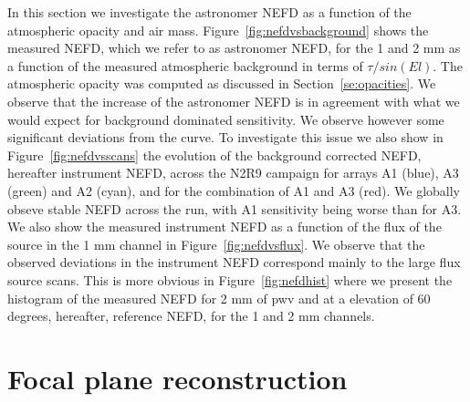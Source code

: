 \documentclass[a4paper, 11pt]{article} %
\begin{document}
In this section we investigate the astronomer NEFD as a function of the atmospheric opacity and air mass. Figure~\ref{fig:nefdvsbackground} shows the measured NEFD, which we refer to as astronomer NEFD, for the 1 and 2 mm as a function of the measured atmospheric background in terms of $\tau/sin(El)$. The atmospheric opacity was computed as discussed in Section~\ref{se:opacities}. We observe that the increase of the astronomer NEFD is in agreement with what we would expect for background dominated sensitivity. We observe however some significant deviations from the curve. To investigate this issue we also show in Figure~\ref{fig:nefdvsscans} the evolution of the background corrected NEFD, hereafter instrument NEFD, across the N2R9 campaign for arrays A1 (blue), A3 (green) and A2 (cyan), and for the combination of A1 and A3 (red). We globally obseve stable NEFD across the run, with A1 sensitivity being worse than for A3. We also show the measured instrument NEFD as a function of the flux of the source in the 1 mm channel in Figure~\ref{fig:nefdvsflux}. We observe that the observed deviations in the instrument NEFD correspond mainly to the large flux source scans. This is more obvious in Figure~\ref{fig:nefdhist} where we present the histogram of the measured NEFD for 2 mm of pwv and at a elevation of 60 degrees, hereafter, reference NEFD, for the 1 and 2 mm channels.



\section{Focal plane reconstruction}
\label{se:fov}
\end{document}
